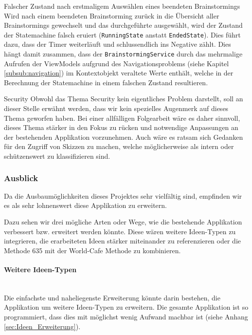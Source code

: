 \begin{basedescript}{
		\desclabelstyle{\multilinelabel}
		\desclabelwidth{3.5cm}
		\setlength{\itemsep}{5ex}}
	\item [Falscher Zustand nach erstmaligem Auswählen eines beendeten Brainstormings] Wird nach einem beendeten Brainstorming zurück in die Übersicht aller Brainstormings gewechselt und das durchgeführte ausgewählt, wird der Zustand der Statemachine falsch eruiert (\texttt{RunningState} anstatt \texttt{EndedState}). Dies führt dazu, dass der Timer weiterläuft und schlussendlich ins Negative zählt. Dies hängt damit zusammen, dass der \texttt{Brainstorming\-Service} durch das mehrmalige Aufrufen der ViewModels aufgrund des Navigationsproblems (siehe Kapitel \ref{subsub:navigation}) im  Kontextobjekt veraltete Werte enthält, welche in der Berechnung der Statemachine in einem falschen Zustand resultieren. 
	
	\item [Security] Obwohl das Thema Security kein eigentliches Problem darstellt, soll an dieser Stelle erwähnt werden, dass wir kein spezielles Augenmerk auf dieses Thema geworfen haben. Bei einer allfälligen Folgearbeit wäre es daher sinnvoll, dieses Thema stärker in den Fokus zu rücken und notwendige Anpassungen an der bestehenden Applikation vorzunehmen. Auch wäre es ratsam sich Gedanken für den Zugriff von Skizzen zu machen, welche möglicherweise als intern oder schützenswert zu klassifizieren sind.
\end{basedescript}


\subsubsection{Ausblick}
\label{subsub:Ausblick}
Da die Ausbaumöglichkeiten dieses Projektes sehr vielfältig sind, empfinden wir es als sehr lohnenswert diese Applikation zu erweitern.

Dazu sehen wir drei mögliche Arten oder Wege, wie die bestehende Applikation verbessert bzw. erweitert werden könnte. Diese wären weitere Ideen-Typen zu integrieren, die erarbeiteten Ideen stärker miteinander zu referenzieren oder die Methode 635 mit der World-Cafe Methode zu kombinieren.

\paragraph*{Weitere Ideen-Typen}~\\
Die einfachste und naheliegenste Erweiterung könnte darin bestehen, die Applikation um weitere Ideen-Typen zu erweitern. Die gesamte Applikation ist so programmiert, dass dies mit möglichst wenig Aufwand machbar ist (siehe Anhang \ref{sec:Ideen_Erweiterung}). 

